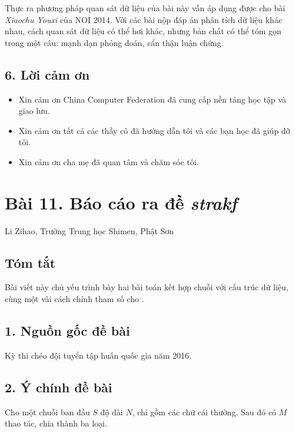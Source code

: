\documentclass[11pt]{article}
\begin{document}
Thực ra phương pháp quan sát dữ liệu của bài này vẫn áp dụng được cho bài
\emph{Xiaochu Youxi} của NOI 2014. Với các bài nộp đáp án phân tích dữ liệu
khác nhau, cách quan sát dữ liệu có thể hơi khác, nhưng bản chất có thể tóm
gọn trong một câu: mạnh dạn phỏng đoán, cẩn thận luận chứng.

\subsection*{6. Lời cảm ơn}

\begin{itemize}
  \item Xin cảm ơn China Computer Federation đã cung cấp nền tảng học tập và
  giao lưu.
  \item Xin cảm ơn tất cả các thầy cô đã hướng dẫn tôi và các bạn học đã giúp
  đỡ tôi.
  \item Xin cảm ơn cha mẹ đã quan tâm và chăm sóc tôi.
\end{itemize}

\section*{Bài 11. Báo cáo ra đề \emph{strakf}}

\begin{center}
Li Zihao, Trường Trung học Shimen, Phật Sơn
\end{center}

\subsection*{Tóm tắt}

Bài viết này chủ yếu trình bày hai bài toán kết hợp chuỗi với cấu trúc dữ
liệu, cùng một vài cách chỉnh tham số cho .

\subsection*{1. Nguồn gốc đề bài}

Kỳ thi chéo đội tuyển tập huấn quốc gia năm 2016.

\subsection*{2. Ý chính đề bài}

Cho một chuỗi ban đầu \(S\) độ dài \(N\), chỉ gồm các chữ cái thường. Sau đó
có \(M\) thao tác, chia thành ba loại.
\end{document}
